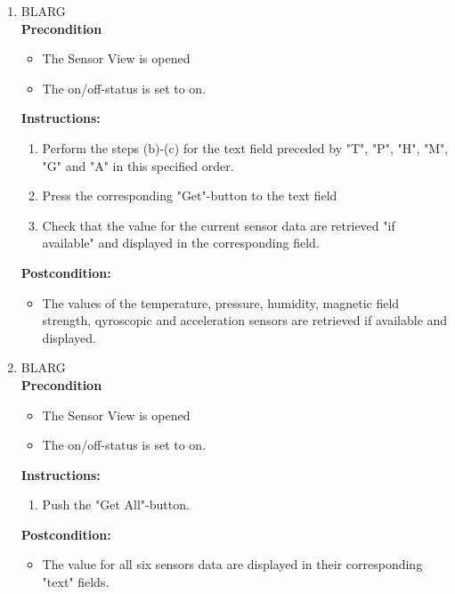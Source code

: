 \documentclass[a4paper]{article}
\newlength{\testlabellength}
\newenvironment{testlist}{\begin{enumerate}[label=\bfseries Instruction \thesubsection.\arabic* , labelindent=0pt, labelwidth=\testlabellength , leftmargin=2cm]}{\end{enumerate}}
\newenvironment{precondition}{
{\color{white}BLARG}\\ 
\textbf{Precondition}
\begin{itemize}[labelindent=0cm, labelwidth=2cm , leftmargin=1cm]
}
{\end{itemize}}
\newenvironment{instruction}{
\textbf{Instructions:}
\begin{enumerate}[label=\bfseries  \arabic*., labelindent=0cm, labelwidth=2cm , leftmargin=1cm]
}
{\end{enumerate}}
\newenvironment{postcondition}{
\textbf{Postcondition:}
\begin{itemize}[labelindent=0cm, labelwidth=2cm , leftmargin=1cm]
}
{\end{itemize}}
\begin{document}
\begin{appendices}
\begin{testlist}
	\item
		\begin{precondition}
			\item The Sensor View is opened
			\item The on/off-status is set to on.
		\end{precondition}
		\begin{instruction}
			\item Perform the steps (b)-(c) for the text field preceded by "T", "P", "H", "M", "G" and "A" in this specified order.
			\item Press the corresponding "Get"-button to the text field
			\item Check that the value for the current sensor data are retrieved "if available" and displayed in the corresponding field.
		\end{instruction}
		\begin{postcondition}
			\item The values of the temperature, pressure, humidity, magnetic field strength, qyroscopic and acceleration sensors are retrieved if available and displayed.
		\end{postcondition}


	\item
		\begin{precondition}
			\item The Sensor View is opened
			\item The on/off-status is set to on.
		\end{precondition}
		\begin{instruction}
			\item Push the "Get All"-button.
		\end{instruction}
		\begin{postcondition}
			\item The value for all six sensors data are displayed in their corresponding "text" fields.
		\end{postcondition}


\end{testlist}
\end{appendices}
\end{document}
